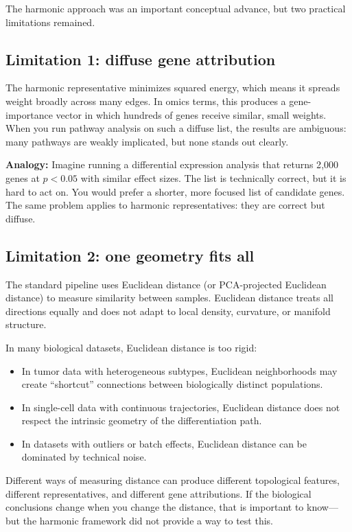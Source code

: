 \documentclass[11pt]{article}
\makeatletter
\newenvironment{biobox}{%
  \par\vspace{8pt}\noindent\fboxrule=1pt\fboxsep=8pt%
  \begin{lrbox}{\@tempboxa}\begin{minipage}{\dimexpr\linewidth-2\fboxsep-2\fboxrule}}%
  {\end{minipage}\end{lrbox}\fcolorbox{green!40!black}{white}{\usebox{\@tempboxa}}\par\vspace{8pt}}
\makeatother
\begin{document}
The harmonic approach was an important conceptual advance, but two practical limitations remained.

\subsection{Limitation 1: diffuse gene attribution}

The harmonic representative minimizes squared energy, which means it spreads weight broadly across many edges.
In omics terms, this produces a gene-importance vector in which hundreds of genes receive similar, small weights.
When you run pathway analysis on such a diffuse list, the results are ambiguous: many pathways are weakly implicated, but none stands out clearly.

\begin{biobox}
\textbf{Analogy:} Imagine running a differential expression analysis that returns 2{,}000 genes at $p < 0.05$ with similar effect sizes.
The list is technically correct, but it is hard to act on.
You would prefer a shorter, more focused list of candidate genes.
The same problem applies to harmonic representatives: they are correct but diffuse.
\end{biobox}

\subsection{Limitation 2: one geometry fits all}

The standard pipeline uses Euclidean distance (or PCA-projected Euclidean distance) to measure similarity between samples.
Euclidean distance treats all directions equally and does not adapt to local density, curvature, or manifold structure.

In many biological datasets, Euclidean distance is too rigid:
\begin{itemize}[leftmargin=1.5em]
\item In tumor data with heterogeneous subtypes, Euclidean neighborhoods may create ``shortcut'' connections between biologically distinct populations.
\item In single-cell data with continuous trajectories, Euclidean distance does not respect the intrinsic geometry of the differentiation path.
\item In datasets with outliers or batch effects, Euclidean distance can be dominated by technical noise.
\end{itemize}

Different ways of measuring distance can produce different topological features, different representatives, and different gene attributions.
If the biological conclusions change when you change the distance, that is important to know---but the harmonic framework did not provide a way to test this.
\end{document}
